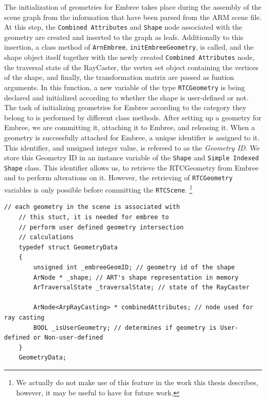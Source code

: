 The initialization of geometries for Embree takes place during the assembly of the scene graph from the information that have been parsed from the ARM scene file. At this step, the \texttt{Combined Attributes} and \texttt{Shape} node associated with the geometry are created and inserted to the graph as leafs. Additionally to this insertion, a class method of \texttt{ArnEmbree}, \texttt{initEmbreeGeometry}, is called, and the shape object itself together with the newly created \texttt{Combined Attributes} node, the traversal state  of the RayCaster, the vertex set object containing the vertices of the shape, and finally, the transformation matrix are passed as funtion arguments. In this function, a new variable of the type \texttt{RTCGeometry} is being declared and initialized according to whether the shape is user-defined or not. The task of initializing geometries for Embree according to the category they belong to is performed by different class methods. After setting up a geometry for Embree, we are committing it, attaching it to Embree, and releasing it. When a geometry is successfully attached for Embree, a unique identifier is assigned to it. This identifier, and unsigned integer value, is refereed to as the \emph{Geometry ID}. We store this Geometry ID in an instance variable of the \texttt{Shape} and \texttt{Simple Indexed Shape} class. This identifier allows us, to retrieve the RTCGeometry from Embree and to perform alterations on it. However, the retrieving of \texttt{RTCGeometry} variables is only possible before committing the \texttt{RTCScene}. \footnote{We actually do not make use of this feature in the work this thesis describes, however, it may be useful to have for future work.}

\begin{listing} 
	\begin{lstlisting}[caption={\texttt{C} struct associated with each initialized geometry.}, label={lst:geometry_data}]
	// each geometry in the scene is associated with
	// this stuct, it is needed for embree to
	// perform user defined geometry intersection
	// calculations
	typedef struct GeometryData 
	{
		unsigned int _embreeGeomID; // geometry id of the shape
		ArNode * _shape; // ART's shape representation in memory
		ArTraversalState _traversalState; // state of the RayCaster
		
		ArNode<ArpRayCasting> * combinedAttributes; // node used for ray casting
		BOOL _isUserGeometry; // determines if geometry is User-defined or Non-user-defined
	}
	GeometryData;
	\end{lstlisting}
\end{listing}

